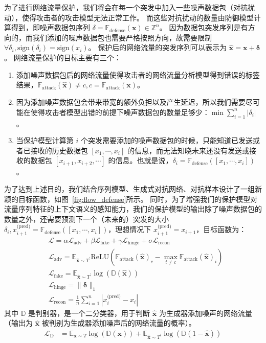 \documentclass[degree=master,cjk-font=noto]{thuthesis}
\begin{document}
为了进行网络流量保护，我们将会在每一个突发中加入一些噪声数据包（对抗扰动），使得攻击者的攻击模型无法正常工作。
而这些对抗扰动的数量由防御模型计算得到，即噪声数据包序列 $\delta = \mathbb{F}_{\text{defense}}(\boldsymbol{x}) \in \mathbb{Z}^n$。
因为数据包突发序列是有方向的，而我们添加的噪声数据包也需要严格按照方向，故需要限制 $\forall \delta_i, \text{sign}(\delta_i) = \text{sign}(x_i)$。
保护后的网络流量的突发序列可以表示为 $\hat{\boldsymbol{x}} = \boldsymbol{x} + \boldsymbol{\delta}$。
网络流量保护的目标主要有三个：

\begin{enumerate}
	\item 添加噪声数据包后的网络流量使得攻击者的网络流量分析模型得到错误的标签结果，$\mathbb{F}_{\text{attack}}(\hat{\boldsymbol{x}}) \ne c, c = \mathbb{F}_{\text{attack}}(\boldsymbol{x})$。
	\item 因为添加噪声数据包会带来带宽的额外负担以及产生延迟，所以我们需要尽可能在使得攻击者模型出错的前提下噪声数据包的数量足够少：$\min \sum_{i=1}^n |\delta_i|$。
	\item 当保护模型计算第 $i$ 个突发需要添加的噪声数据包的时候，只能知道已发送或者已接收的历史数据包 $[x_1, \cdots, x_i]$ 的信息，而无法知晓未来还没有发送或接收的数据包 $[x_{i+1}, x_{i+2}, \cdots]$ 的信息。也就是说，$\delta_i = \mathbb{F}_{\text{defense}}([x_1, \cdots, x_i])$。
\end{enumerate}

为了达到上述目的，我们结合序列模型、生成式对抗网络、对抗样本设计了一组新颖的目标函数，如图~\ref{fig:flow_defense}所示。
同时，为了增强我们的保护模型对流量序列特征的上下文语义的感知能力，我们的保护模型的输出除了噪声数据包的数量之外，还需要预测下一个（未来的）突发的大小 $\delta_i, x_{i+1}^{\text{(pred)}} = \mathbb{F}_{\text{defense}}([x_1, \cdots, x_i])$，理想情况下 $x_{i+1}^{\text{(pred)}} = x_{i+1}$，目标函数为：
\begin{align}
	&\mathcal{L} = \alpha \mathcal{L}_{\text{adv}} + \beta \mathcal{L}_{\text{fake}} + \gamma \mathcal{L}_{\text{hinge}} + \sigma \mathcal{L}_{\text{recon}} \\
	&\mathcal{L}_{\text{adv}} = \mathbb{E}_{\hat{\boldsymbol{x}} \sim T^\prime} \text{ReLU} \left(\mathbb{F}_{\text{attack}} (\hat{\boldsymbol{x}})_c - \max_{t \ne c} \mathbb{F}_{\text{attack}} (\hat{\boldsymbol{x}})_i \right) \\
	&\mathcal{L}_{\text{fake}} = \mathbb{E}_{\hat{\boldsymbol{x}} \sim T^\prime} \log (\mathbb{D}(\hat{\boldsymbol{x}})) \\
	&\mathcal{L}_{\text{hinge}} = \lVert \boldsymbol{\delta} \rVert_1 \\
	&\mathcal{L}_{\text{recon}} = \frac{1}{n} \sum_{i=1}^n |x^{\text{(pred)}}_i - x_i|
\end{align}
其中 $\mathbb{D}$ 是判别器，是一个二分类器，用于判断 $\hat{\boldsymbol{x}}$ 为生成器添加噪声的网络流量（输出为 $\hat{\boldsymbol{x}}$ 被判别为生成器添加噪声后的网络流量的概率）。
\begin{align}
	\mathcal{L}_{\text{D}} &= \mathbb{E}_{\boldsymbol{x} \sim T} \log (\mathbb{D}(\boldsymbol{x})) + \mathbb{E}_{\hat{\boldsymbol{x}} \sim T^\prime} \log (\mathbb{D}(1 - \hat{\boldsymbol{x}}))
\end{align}
\end{document}
